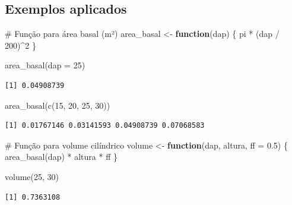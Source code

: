 \documentclass[
  letterpaper,
]{scrbook}
\newenvironment{Shaded}{\begin{snugshade}}{\end{snugshade}}
\newcommand{\AttributeTok}[1]{\textcolor[rgb]{0.40,0.45,0.13}{#1}}
\newcommand{\CommentTok}[1]{\textcolor[rgb]{0.37,0.37,0.37}{#1}}
\newcommand{\ControlFlowTok}[1]{\textcolor[rgb]{0.00,0.23,0.31}{\textbf{#1}}}
\newcommand{\DecValTok}[1]{\textcolor[rgb]{0.68,0.00,0.00}{#1}}
\newcommand{\FloatTok}[1]{\textcolor[rgb]{0.68,0.00,0.00}{#1}}
\newcommand{\FunctionTok}[1]{\textcolor[rgb]{0.28,0.35,0.67}{#1}}
\newcommand{\NormalTok}[1]{\textcolor[rgb]{0.00,0.23,0.31}{#1}}
\newcommand{\OtherTok}[1]{\textcolor[rgb]{0.00,0.23,0.31}{#1}}
\newcommand{\SpecialCharTok}[1]{\textcolor[rgb]{0.37,0.37,0.37}{#1}}
\begin{document}
\subsection{Exemplos aplicados}\label{exemplos-aplicados}

\begin{Shaded}
\begin{Highlighting}[]
\CommentTok{\# Função para área basal (m²)}
\NormalTok{area\_basal }\OtherTok{\textless{}{-}} \ControlFlowTok{function}\NormalTok{(dap) \{}
\NormalTok{  pi }\SpecialCharTok{*}\NormalTok{ (dap }\SpecialCharTok{/} \DecValTok{200}\NormalTok{)}\SpecialCharTok{\^{}}\DecValTok{2}
\NormalTok{\}}

\FunctionTok{area\_basal}\NormalTok{(}\AttributeTok{dap =} \DecValTok{25}\NormalTok{)}
\end{Highlighting}
\end{Shaded}

\begin{verbatim}
[1] 0.04908739
\end{verbatim}

\begin{Shaded}
\begin{Highlighting}[]
\FunctionTok{area\_basal}\NormalTok{(}\FunctionTok{c}\NormalTok{(}\DecValTok{15}\NormalTok{, }\DecValTok{20}\NormalTok{, }\DecValTok{25}\NormalTok{, }\DecValTok{30}\NormalTok{))}
\end{Highlighting}
\end{Shaded}

\begin{verbatim}
[1] 0.01767146 0.03141593 0.04908739 0.07068583
\end{verbatim}

\begin{Shaded}
\begin{Highlighting}[]
\CommentTok{\# Função para volume cilíndrico}
\NormalTok{volume }\OtherTok{\textless{}{-}} \ControlFlowTok{function}\NormalTok{(dap, altura, }\AttributeTok{ff =} \FloatTok{0.5}\NormalTok{) \{}
  \FunctionTok{area\_basal}\NormalTok{(dap) }\SpecialCharTok{*}\NormalTok{ altura }\SpecialCharTok{*}\NormalTok{ ff}
\NormalTok{\}}

\FunctionTok{volume}\NormalTok{(}\DecValTok{25}\NormalTok{, }\DecValTok{30}\NormalTok{)}
\end{Highlighting}
\end{Shaded}

\begin{verbatim}
[1] 0.7363108
\end{verbatim}
\end{document}
